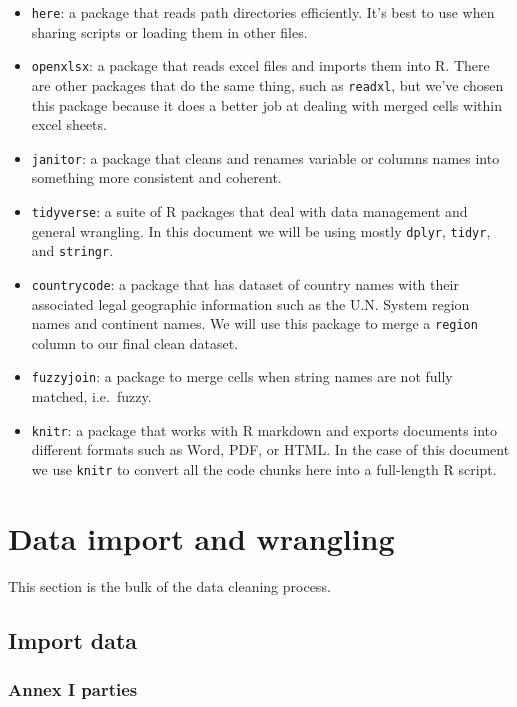 \documentclass[
  12pt,
]{article}
\begin{document}
\begin{itemize}
\item
  \texttt{here}: a package that reads path directories efficiently. It's
  best to use when sharing scripts or loading them in other files.
\item
  \texttt{openxlsx}: a package that reads excel files and imports them
  into R. There are other packages that do the same thing, such as
  \texttt{readxl}, but we've chosen this package because it does a
  better job at dealing with merged cells within excel sheets.
\item
  \texttt{janitor}: a package that cleans and renames variable or
  columns names into something more consistent and coherent.
\item
  \texttt{tidyverse}: a suite of R packages that deal with data
  management and general wrangling. In this document we will be using
  mostly \texttt{dplyr}, \texttt{tidyr}, and \texttt{stringr}.
\item
  \texttt{countrycode}: a package that has dataset of country names with
  their associated legal geographic information such as the U.N. System
  region names and continent names. We will use this package to merge a
  \texttt{region} column to our final clean dataset.
\item
  \texttt{fuzzyjoin}: a package to merge cells when string names are not
  fully matched, i.e.~fuzzy.
\item
  \texttt{knitr}: a package that works with R markdown and exports
  documents into different formats such as Word, PDF, or HTML. In the
  case of this document we use \texttt{knitr} to convert all the code
  chunks here into a full-length R script.
\end{itemize}

\hypertarget{data-import-and-wrangling}{%
\section{Data import and wrangling}\label{data-import-and-wrangling}}

This section is the bulk of the data cleaning process.

\hypertarget{import-data}{%
\subsection{Import data}\label{import-data}}

\hypertarget{annex-i-parties}{%
\subsubsection{Annex I parties}\label{annex-i-parties}}
\end{document}
